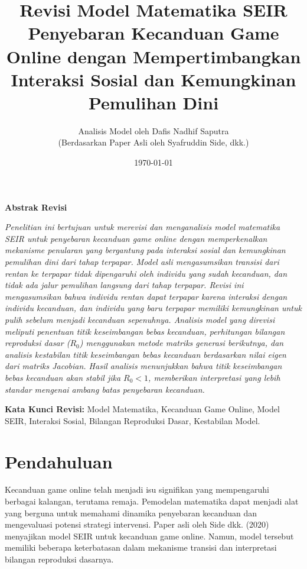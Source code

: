 \documentclass[12pt,a4paper]{article}
\title{Revisi Model Matematika SEIR Penyebaran Kecanduan Game Online dengan Mempertimbangkan Interaksi Sosial dan Kemungkinan Pemulihan Dini}
\author{Analisis Model oleh Dafis Nadhif Saputra \\ (Berdasarkan Paper Asli oleh Syafruddin Side, dkk.)}
\date{\today}
\begin{document}
\maketitle
\begin{center}
    \textbf{Abstrak Revisi}
\end{center}
\textit{Penelitian ini bertujuan untuk merevisi dan menganalisis model matematika SEIR untuk penyebaran kecanduan game online dengan memperkenalkan mekanisme penularan yang bergantung pada interaksi sosial dan kemungkinan pemulihan dini dari tahap terpapar. Model asli mengasumsikan transisi dari rentan ke terpapar tidak dipengaruhi oleh individu yang sudah kecanduan, dan tidak ada jalur pemulihan langsung dari tahap terpapar. Revisi ini mengasumsikan bahwa individu rentan dapat terpapar karena interaksi dengan individu kecanduan, dan individu yang baru terpapar memiliki kemungkinan untuk pulih sebelum menjadi kecanduan sepenuhnya. Analisis model yang direvisi meliputi penentuan titik keseimbangan bebas kecanduan, perhitungan bilangan reproduksi dasar ($R_0$) menggunakan metode matriks generasi berikutnya, dan analisis kestabilan titik keseimbangan bebas kecanduan berdasarkan nilai eigen dari matriks Jacobian. Hasil analisis menunjukkan bahwa titik keseimbangan bebas kecanduan akan stabil jika $R_0 < 1$, memberikan interpretasi yang lebih standar mengenai ambang batas penyebaran kecanduan.}

\vspace{0.5cm}
\noindent
\textbf{Kata Kunci Revisi:} Model Matematika, Kecanduan Game Online, Model SEIR, Interaksi Sosial, Bilangan Reproduksi Dasar, Kestabilan Model.

\section{Pendahuluan}
Kecanduan game online telah menjadi isu signifikan yang mempengaruhi berbagai kalangan, terutama remaja. Pemodelan matematika dapat menjadi alat yang berguna untuk memahami dinamika penyebaran kecanduan dan mengevaluasi potensi strategi intervensi. Paper asli oleh Side dkk. (2020) menyajikan model SEIR untuk kecanduan game online. Namun, model tersebut memiliki beberapa keterbatasan dalam mekanisme transisi dan interpretasi bilangan reproduksi dasarnya.
\end{document}
